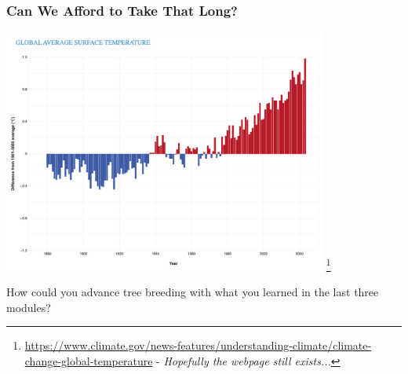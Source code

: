 \documentclass[xcolor=dvipsnames]{beamer}
\newcommand\blfootnote[1]{%
	\begingroup
	\renewcommand\thefootnote{}\footnote{#1}%
	\addtocounter{footnote}{-1}%
	\endgroup
}
\begin{document}
\begin{frame}
\frametitle{Can We Afford to Take That Long?}
\centering
	\includegraphics[keepaspectratio, width  = 0.8\textwidth]{img/graph_globalavgsurfacetemp}
	\blfootnote{\url{https://www.climate.gov/news-features/understanding-climate/climate-change-global-temperature} - \textit{Hopefully the webpage still exists...}}
\end{frame}




\begin{frame}
	\Huge How could you advance tree breeding with what you learned in the last three modules?
\end{frame}
\end{document}
